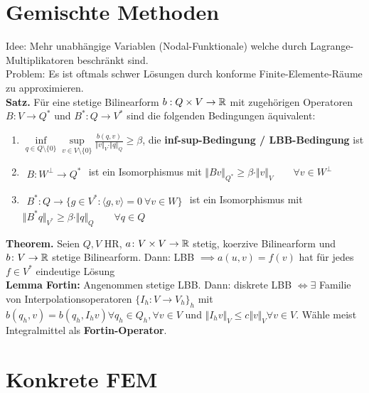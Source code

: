 \documentclass[12pt]{scrartcl}
\begin{document}
	\section{Gemischte Methoden}
	Idee: Mehr unabhängige Variablen (Nodal-Funktionale) welche durch Lagrange-Multiplikatoren beschränkt sind.\\
	Problem: Es ist oftmals schwer Lösungen durch konforme Finite-Elemente-Räume zu approximieren.\\
	\textbf{Satz.} Für eine stetige Bilinearform $b:Q\times V\to\mathbb{R}$ mit zugehörigen Operatoren
	$B\colon V\to Q^\ast$ und $B^\ast\colon Q\to V^\ast$ sind die folgenden Bedingungen äquivalent:
	\begin{enumerate}[label=(\roman*)]
		\item $\inf\limits_{q\in Q\setminus\lbrace0\rbrace}\sup\limits_{v\in V\setminus\lbrace0\rbrace}\frac{b(q,v)}{\Vert v\Vert_V\cdot\Vert q\Vert_Q}\geq\beta$, die \textbf{inf-sup-Bedingung / LBB-Bedingung} ist 
		\item $\begin{aligned}
			B\colon W^\perp\to Q^\ast
		\end{aligned}$ ist ein Isomorphismus mit $\Vert B v\Vert_{Q^\ast}\geq\beta\cdot\Vert v\Vert_V\qquad\forall v\in W^\perp$
		\item $\begin{aligned}
			B^\ast\colon Q\to\big\lbrace g\in V^\ast:\langle g,v\rangle=0~\forall v\in W\big\rbrace
		\end{aligned}$ ist ein Isomorphismus mit $\big\Vert B^\ast q\big\Vert_{V^\ast}\geq\beta\cdot\Vert q\Vert_Q\qquad\forall q\in Q$
	\end{enumerate}
	\textbf{Theorem.} Seien $Q,V$ HR, $a\colon V\times V\to\mathbb{R}$ stetig, koerzive Bilinearform und $b\colon V\to\mathbb{R}$ stetige Bilinearform. Dann: LBB $\implies a(u,v)=f(v)$ hat für jedes $f\in V^\ast$ eindeutige Lösung\\
	\textbf{Lemma Fortin:} Angenommen stetige LBB. Dann: diskrete LBB $\Leftrightarrow\exists$ Familie von Interpolationsoperatoren $\lbrace I_h:V\to V_h\rbrace_h$ mit $b(q_h,v)=b(q_h,I_h v)\forall q_h\in Q_h,\forall v\in V$ und $\Vert I_h v\Vert_V\leq c\Vert v\Vert_V\forall v\in V$. Wähle meist Integralmittel als \textbf{Fortin-Operator}.
	
	\section{Konkrete FEM}
	
\end{document}

